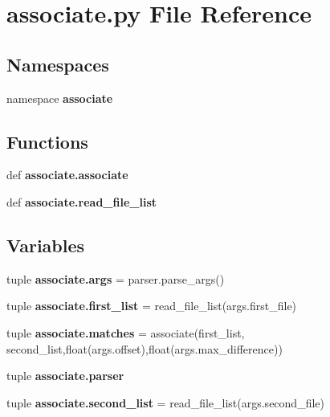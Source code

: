 \section{associate.\-py \-File \-Reference}
\label{associate_8py}
\subsection*{\-Namespaces}
\begin{DoxyCompactItemize}
\item 
namespace {\bf associate}
\end{DoxyCompactItemize}
\subsection*{\-Functions}
\begin{DoxyCompactItemize}
\item 
def {\bf associate.\-associate}
\item 
def {\bf associate.\-read\-\_\-file\-\_\-list}
\end{DoxyCompactItemize}
\subsection*{\-Variables}
\begin{DoxyCompactItemize}
\item 
tuple {\bf associate.\-args} = parser.\-parse\-\_\-args()
\item 
tuple {\bf associate.\-first\-\_\-list} = read\-\_\-file\-\_\-list(args.\-first\-\_\-file)
\item 
tuple {\bf associate.\-matches} = associate(first\-\_\-list, second\-\_\-list,float(args.\-offset),float(args.\-max\-\_\-difference))
\item 
tuple {\bf associate.\-parser}
\item 
tuple {\bf associate.\-second\-\_\-list} = read\-\_\-file\-\_\-list(args.\-second\-\_\-file)
\end{DoxyCompactItemize}
